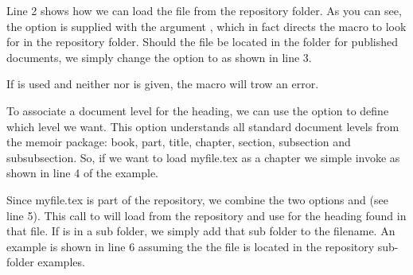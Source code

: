 Line 2 shows how we can load the file  from the repository folder.
As you can see, the option  is supplied with the argument ,
which in fact directs the macro to look for  in the repository folder.
Should the file be located in the folder for published documents, we simply change the 
 option to  as shown in line 3.

If  is used and neither  nor  is given, the macro will trow an error.

To associate a document level for the heading, we can use the option  to define which 
level we want. This option understands all standard document levels from the memoir package: book, part, 
title, chapter, section, subsection and subsubsection. So, if we want to load myfile.tex as a chapter 
we simple invoke \cmd{\skbinput} as shown in line 4 of the example.

Since myfile.tex is part of the repository,
we combine the two options  and  (see line 5).
This call to \cmd{} will load  from the repository and use \cmd{\chapter} for 
the heading found in that file. If  is in a sub folder, we simply add that sub folder to 
the filename. An example is shown in line 6 assuming the the file is located in the repository sub-folder 
examples.
